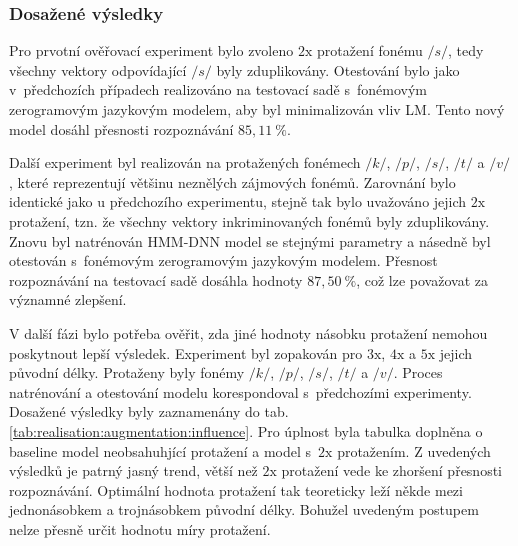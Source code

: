 \subsubsection{Dosažené výsledky}


Pro prvotní ověřovací experiment bylo zvoleno $2\mathrm{x}$ protažení fonému $/s/$, tedy všechny vektory odpovídající $/s/$ byly zduplikovány.
Otestování bylo jako v~předchozích případech realizováno na testovací sadě s~fonémovým zerogramovým jazykovým modelem, aby byl minimalizován vliv LM.
Tento nový model dosáhl přesnosti rozpoznávání $85,11~\%$.

Další experiment byl realizován na protažených fonémech $/k/$, $/p/$, $/s/$, $/t/$ a $/v/$, které reprezentují většinu neznělých zájmových fonémů.
Zarovnání bylo identické jako u předchozího experimentu, stejně tak bylo uvažováno jejich $2\mathrm{x}$ protažení, tzn. že všechny vektory inkriminovaných fonémů byly zduplikovány.
Znovu byl natrénován HMM-DNN model se stejnými parametry a násedně byl otestován s~fonémovým zerogramovým jazykovým modelem.
Přesnost rozpoznávání na testovací sadě dosáhla hodnoty $87,50~\%$, což lze považovat za významné zlepšení.

V další fázi bylo potřeba ověřit, zda jiné hodnoty násobku protažení nemohou poskytnout lepší výsledek.
Experiment byl zopakován pro $3\mathrm{x}$, $4\mathrm{x}$ a $5\mathrm{x}$ jejich původní délky.
Protaženy byly fonémy $/k/$, $/p/$, $/s/$, $/t/$ a $/v/$.
Proces natrénování a otestování modelu korespondoval s~předchozími experimenty.
Dosažené výsledky byly zaznamenány do tab. \ref{tab:realisation:augmentation:influence}.
Pro úplnost byla tabulka doplněna o baseline model neobsahuhjící protažení a model s~$2\mathrm{x}$ protažením.
Z uvedených výsledků je patrný jasný trend, větší než $2\mathrm{x}$ protažení vede ke zhoršení přesnosti rozpoznávání.
Optimální hodnota protažení tak teoreticky leží někde mezi jednonásobkem a trojnásobkem původní délky.
Bohužel uvedeným postupem nelze přesně určit hodnotu míry protažení.


